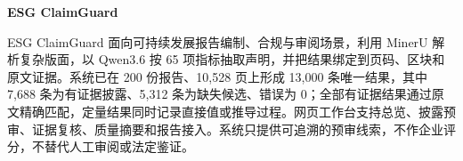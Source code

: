 \documentclass[UTF8,a4paper,11pt]{ctexart}
\begin{document}
\begin{center}
{\fontsize{23}{30}\selectfont\bfseries\sffamily\color{branddark} ESG ClaimGuard\par}
\vspace{10mm}
\end{center}
ESG ClaimGuard 面向可持续发展报告编制、合规与审阅场景，利用 MinerU 解析复杂版面，以 Qwen3.6 按 65 项指标抽取声明，并把结果绑定到页码、区块和原文证据。系统已在 200 份报告、10,528 页上形成 13,000 条唯一结果，其中 7,688 条为有证据披露、5,312 条为缺失候选、错误为 0；全部有证据结果通过原文精确匹配，定量结果同时记录直接值或推导过程。网页工作台支持总览、披露预审、证据复核、质量摘要和报告接入。系统只提供可追溯的预审线索，不作企业评分，不替代人工审阅或法定鉴证。\par
\end{document}
